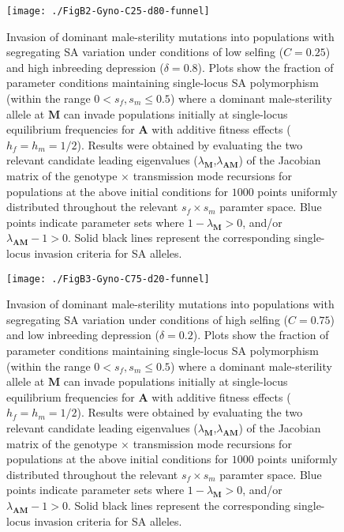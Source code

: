 \documentclass{article}
\begin{document}
\begin{figure}[ht!]
\centering
\texttt{[image: ./FigB2-Gyno-C25-d80-funnel]}
\caption{Invasion of dominant male-sterility mutations into populations with segregating SA variation under conditions of low selfing ($C = 0.25$) and high inbreeding depression ($\delta = 0.8$). Plots show the fraction of parameter conditions maintaining single-locus SA polymorphism (within the range $0 < s_f,s_m \leq 0.5$) where a dominant male-sterility allele at $\mathbf{M}$ can invade populations initially at single-locus equilibrium frequencies for $\mathbf{A}$ with additive fitness effects ($h_f=h_m=1/2$). Results were obtained by evaluating the two relevant candidate leading eigenvalues ($\lambda_{\mathbf{M}}$,$\lambda_{\mathbf{AM}}$) of the Jacobian matrix of the genotype $\times$ transmission mode recursions for populations at the above initial conditions for $1000$ points uniformly distributed throughout the relevant $s_f \times s_m$ paramter space. Blue points indicate parameter sets where $1 - \lambda_{\mathbf{M}} > 0$, and/or $\lambda_{\mathbf{AM}} - 1 > 0$. Solid black lines represent the corresponding single-locus invasion criteria for SA alleles.}
\label{fig:GynC25d80Funnel}
\end{figure}
\newpage{}

\begin{figure}[ht!]
\centering
\texttt{[image: ./FigB3-Gyno-C75-d20-funnel]}
\caption{Invasion of dominant male-sterility mutations into populations with segregating SA variation under conditions of high selfing ($C = 0.75$) and low inbreeding depression ($\delta = 0.2$). Plots show the fraction of parameter conditions maintaining single-locus SA polymorphism (within the range $0 < s_f,s_m \leq 0.5$) where a dominant male-sterility allele at $\mathbf{M}$ can invade populations initially at single-locus equilibrium frequencies for $\mathbf{A}$ with additive fitness effects ($h_f=h_m=1/2$). Results were obtained by evaluating the two relevant candidate leading eigenvalues ($\lambda_{\mathbf{M}}$,$\lambda_{\mathbf{AM}}$) of the Jacobian matrix of the genotype $\times$ transmission mode recursions for populations at the above initial conditions for $1000$ points uniformly distributed throughout the relevant $s_f \times s_m$ paramter space. Blue points indicate parameter sets where $1 - \lambda_{\mathbf{M}} > 0$, and/or $\lambda_{\mathbf{AM}} - 1 > 0$. Solid black lines represent the corresponding single-locus invasion criteria for SA alleles.}
\label{fig:GynC75d20Funnel}
\end{figure}
\newpage{}
\end{document}
